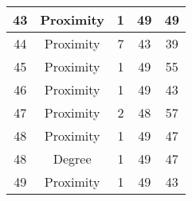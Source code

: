 \documentclass[results.tex]{subfiles}
\begin{document}
\begin{center}
\begin{tabular}{| c || c | c | c | c |}
            \hline
            43                      & Proximity                    & 1                      & 49                      & 49                   \\
            \hline
            44                      & Proximity                    & 7                      & 43                      & 39                   \\
            \hline
            45                      & Proximity                    & 1                      & 49                      & 55                   \\
            \hline
            46                      & Proximity                    & 1                      & 49                      & 43                   \\
            \hline
            47                      & Proximity                    & 2                      & 48                      & 57                   \\
            \hline
            48                      & Proximity                    & 1                      & 49                      & 47                   \\
            \hline
            48                      & Degree                       & 1                      & 49                      & 47                   \\
            \hline
            49                      & Proximity                    & 1                      & 49                      & 43                   \\
            \hline
        \end{tabular}
    \end{center}
\end{document}
